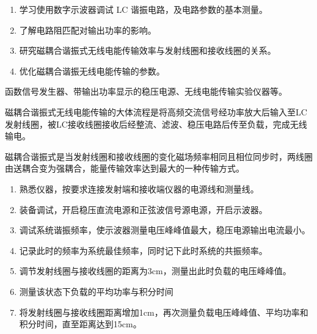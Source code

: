\documentclass[UTF-8, a4paper, 12pt]{ctexart}
\begin{document}
    \begin{center}

    \end{center}

    \textbf{ }

    \songti

    \begin{enumerate}
        \item 学习使用数字示波器调试 LC 谐振电路，及电路参数的基本测量。
        \item 了解电路阻匹配对输出功率的影响。
        \item 研究磁耦合谐振式无线电能传输效率与发射线圈和接收线圈的关系。
        \item 优化磁耦合谐振无线电能传输的参数。
    \end{enumerate}

    \textbf{ }

    \songti

    函数信号发生器、带输出功率显示的稳压电源、无线电能传输实验仪器等。

    \textbf{ }

    \songti

    磁耦合谐振式无线电能传输的大体流程是将高频交流信号经功率放大后输入至LC发射线圈，被LC接收线圈接收后经整流、滤波、稳压电路后传至负载，完成无线输电。

    磁耦合谐振式是当发射线圈和接收线圈的变化磁场频率相同且相位同步时，两线圈由送耦合变为强耦合，能量传输效率达到最大的一种传输方式。

    \textbf{ }

    \songti
    
    \begin{enumerate}[（1）]
        \item 熟悉仪器，按要求连接发射端和接收端仪器的电源线和测量线。
        \item 装备调试，开启稳压直流电源和正弦波信号源电源，开启示波器。
        \item 调试系统谐振频率，使示波器测量电压峰峰值最大，稳压电源输出电流最小。
        \item 记录此时的频率为系统最佳频率，同时记下此时系统的共振频率。
        \item 调节发射线圈与接收线圈的距离为3cm，测量出此时负载的电压峰峰值。
        \item 测量该状态下负载的平均功率与积分时间
        \item 将发射线圈与接收线圈距离增加1cm，再次测量负载电压峰峰值、平均功率和积分时间，直至距离达到15cm。
    \end{enumerate}
\end{document}
